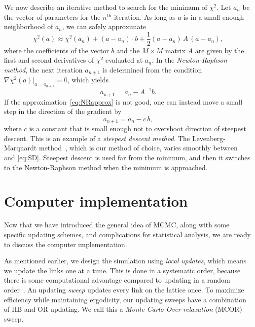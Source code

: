 We now describe an iterative method to search for the minimum of $\chi^2$.
Let $a_n$ be the vector of parameters for the $n^{\text{th}}$ iteration.
As long as $a$ is in a small enough neighborhood of $a_n$, we can safely
approximate
\begin{equation}\label{eq:NRapprox}
  \chi^2(a)\approx\chi^2(a_n)+(a-a_n)\cdot b
           +\frac{1}{2}(a-a_n)\,A\,(a-a_n),
\end{equation}
where the coefficients of the vector $b$ and the $M\times M$ matrix $A$ 
are given by the first and second derivatives of $\chi^2$ evaluated at $a_n$.
In the {\it Newton-Raphson method}, the next 
iteration $a_{n+1}$ is
determined from the condition $\nabla\chi^2(a)|_{a=a_{n+1}}=0$,
which yields
\begin{equation}\label{eq:NR}
  a_{n+1}=a_n-A^{-1}b.
\end{equation}
If the approximation~\eqref{eq:NRapprox} is not good, one can instead move
a small step in the direction of the gradient by
\begin{equation}\label{eq:SD}
  a_{n+1}=a_n-c\,b,
\end{equation}
where $c$ is a constant that is small enough not to overshoot direction
of steepest descent. This is an example of a {\it steepest descent method}.
The Levenberg-Marquardt 
method~\cite{levenberg_method_1944,marquardt_algorithm_1963}, which is 
our method of choice, varies smoothly between~ and 
\eqref{eq:SD}. Steepest descent is used far from the minimum, and 
then it switches to the Newton-Raphson method when the minimum is approached.

\section{Computer implementation}\label{sec:implement}

Now that we have introduced the general idea of MCMC, along with some specific
updating schemes, and complications for statistical analysis, we are ready 
to discuss the computer implementation. 

As mentioned earlier, we design the simulation using {\it local updates}, which
means we update the links one at a time. This is done in a systematic order,
because there is some computational advantage compared to updating in a
random order~\cite{berg_markov_2004}. 
An updating {\it sweep} updates every link on the lattice once. 
To maximize efficiency while maintaining ergodicity, our updating sweeps 
have a combination of HB and OR updating. We call this a 
{\it Monte Carlo Over-relaxation} (MCOR) sweep.

